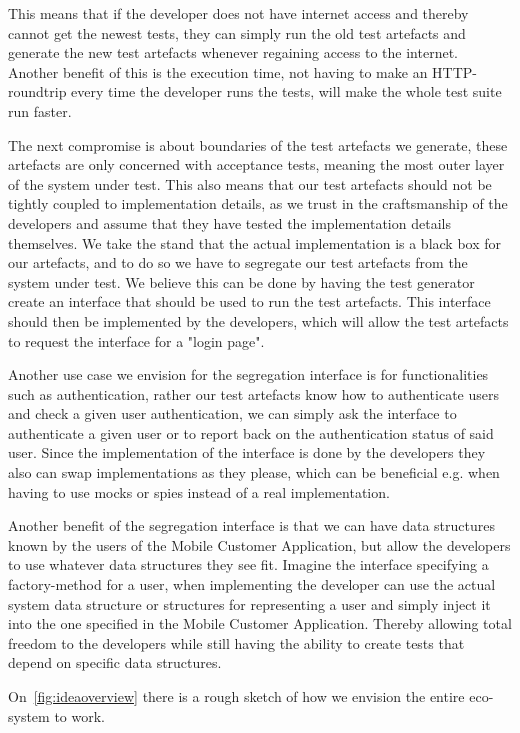This means that if the developer does not have internet access and thereby cannot get the newest tests, they can simply run the old test artefacts and generate the new test artefacts whenever regaining access to the internet.
Another benefit of this is the execution time, not having to make an HTTP-roundtrip every time the developer runs the tests, will make the whole test suite run faster.

The next compromise is about boundaries of the test artefacts we generate, these artefacts are only concerned with acceptance tests, meaning the most outer layer of the system under test. 
This also means that our test artefacts should not be tightly coupled to implementation details, as we trust in the craftsmanship of the developers and assume that they have tested the implementation details themselves.
We take the stand that the actual implementation is a black box for our artefacts, and to do so we have to segregate our test artefacts from the system under test.
We believe this can be done by having the test generator create an interface that should be used to run the test artefacts.
This interface should then be implemented by the developers, which will allow the test artefacts to request the interface for a "login page".

Another use case we envision for the segregation interface is for functionalities such as authentication, rather our test artefacts know how to authenticate users and check a given user authentication, we can simply ask the interface to authenticate a given user or to report back on the authentication status of said user.
Since the implementation of the interface is done by the developers they also can swap implementations as they please, which can be beneficial e.g. when having to use mocks or spies instead of a real implementation.

Another benefit of the segregation interface is that we can have data structures known by the users of the Mobile Customer Application, but allow the developers to use whatever data structures they see fit.
Imagine the interface specifying a factory-method for a user, when implementing the developer can use the actual system data structure or structures for representing a user and simply inject it into the one specified in the Mobile Customer Application.
Thereby allowing total freedom to the developers while still having the ability to create tests that depend on specific data structures.

On~\autoref{fig:ideaoverview} there is a rough sketch of how we envision the entire eco-system to work.
